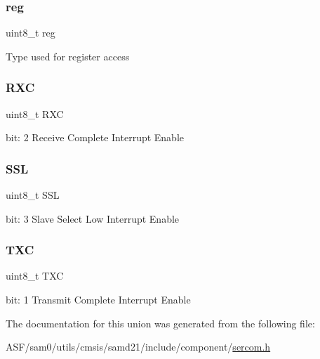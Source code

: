 \subsubsection{\texorpdfstring{reg}{reg}}
{\footnotesize\ttfamily uint8\+\_\+t reg}

Type used for register access \mbox{\label{union_s_e_r_c_o_m___s_p_i___i_n_t_e_n_s_e_t___type_ad465929f0a73cbdc2d5ab6b210909039}} 
\subsubsection{\texorpdfstring{RXC}{RXC}}
{\footnotesize\ttfamily uint8\+\_\+t R\+XC}

bit\+: 2 Receive Complete Interrupt Enable \mbox{\label{union_s_e_r_c_o_m___s_p_i___i_n_t_e_n_s_e_t___type_ac2a5326783ce5e9d294fabed8aba7d3f}} 
\subsubsection{\texorpdfstring{SSL}{SSL}}
{\footnotesize\ttfamily uint8\+\_\+t S\+SL}

bit\+: 3 Slave Select Low Interrupt Enable \mbox{\label{union_s_e_r_c_o_m___s_p_i___i_n_t_e_n_s_e_t___type_a8f012b40a2f5cf52b14d448b314b5cec}} 
\subsubsection{\texorpdfstring{TXC}{TXC}}
{\footnotesize\ttfamily uint8\+\_\+t T\+XC}

bit\+: 1 Transmit Complete Interrupt Enable 

The documentation for this union was generated from the following file\+:\begin{DoxyCompactItemize}
\item 
A\+S\+F/sam0/utils/cmsis/samd21/include/component/\mbox{\hyperlink{utils_2cmsis_2samd21_2include_2component_2sercom_8h}{sercom.\+h}}\end{DoxyCompactItemize}
